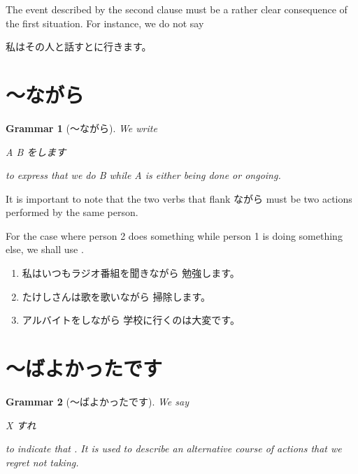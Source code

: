 \documentclass[notoc,notitlepage]{tufte-book}
\newtheorem{grammar}{\faBook Grammar}
\begin{document}
\begin{warning}
  The event described by the second clause must be a rather clear consequence
  of the first situation.
  For instance, we do not say
  \begin{center}
    私はその人と話すとに行きます。
  \end{center}
\end{warning}


\section{〜ながら}%
\label{sec:_nagara}

\begin{grammar}[〜ながら]\label{grammar:nagara}
  We write
  \begin{center}
    A  B をします
  \end{center}
  to express that we do B while A is either being done or ongoing.
\end{grammar}

\begin{note}
  It is important to note that the two verbs that flank ながら
  must be two actions performed by the same person.

  For the case where person 2 does something
  while person 1 is doing something else, we shall use
  .
\end{note}

\begin{eg}
  \begin{enumerate}
    \item 私はいつもラジオ番組を聞きながら
      勉強します。
    \item たけしさんは歌を歌いながら
      掃除します。
    \item アルバイトをしながら
      学校に行くのは大変です。
  \end{enumerate}
\end{eg}


\section{〜ばよかったです}%
\label{sec:_bayokatsutadesu}

\begin{grammar}[〜ばよかったです]\label{grammar:_bayokatsutadesu}
  We say
  \begin{center}
    X すれ
  \end{center}
  to indicate that .
  It is used to describe an alternative course of actions that we
  regret not taking.
\end{grammar}
\end{document}
